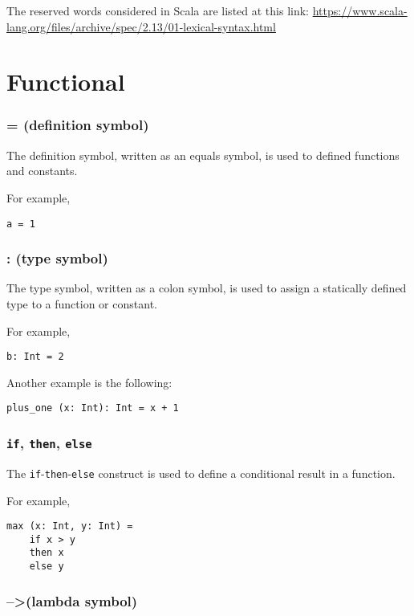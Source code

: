 \documentclass[12pt,a4paper]{book}
\newcommand{\srccode}[1]{\texttt{{#1}}}
\newcommand{\reservedWord}[1]{{\color{blue}\srccode{#1}}\xspace}
\newcommand{\sif}{\reservedWord{if}}
\newcommand{\sthen}{\reservedWord{then}}
\newcommand{\selse}{\reservedWord{else}}
\newcommand{\lambdaSymbol}{{\tiny--\textgreater}\xspace}
\begin{document}
    The reserved words considered in Scala are listed at this link:
    \url{https://www.scala-lang.org/files/archive/spec/2.13/01-lexical-syntax.html}


    \section{Functional}

    \subsubsection{= (definition symbol)}

    The definition symbol, written as an equals symbol, is used to defined functions and constants.

    For example,
    \begin{lstlisting}[label={lst:exampleDef}]
  a = 1
    \end{lstlisting}

    \subsubsection{: (type symbol)}

    The type symbol, written as a colon symbol, is used to assign a statically defined type to a function or constant.

    For example,
    \begin{lstlisting}[label={lst:exampleType01}]
  b: Int = 2
    \end{lstlisting}

    Another example is the following:
    \begin{lstlisting}[label={lst:exampleType02}]
  plus_one (x: Int): Int = x + 1
    \end{lstlisting}

    \subsubsection{\sif, \sthen, \selse}

    The \sif-\sthen-\selse construct is used to define a conditional result in a function.

    For example,
    \begin{lstlisting}[label={lst:exampleIfThenElse}]
  max (x: Int, y: Int) =
    if x > y
    then x
    else y
    \end{lstlisting}

    \subsubsection{\lambdaSymbol (lambda symbol)}
\end{document}
